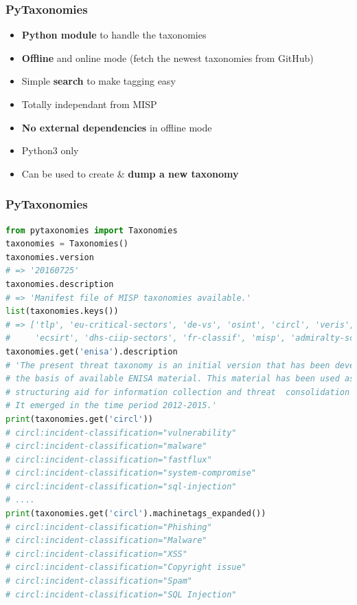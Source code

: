 \begin{frame}
        \frametitle{PyTaxonomies}
\begin{itemize}
    \item {\bf Python module} to handle the taxonomies
    \item {\bf Offline} and online mode (fetch the newest taxonomies from GitHub)
    \item Simple {\bf search} to make tagging easy
        \item Totally independant from MISP
        \item {\bf No external dependencies} in offline mode
        \item Python3 only
        \item Can be used to create \& {\bf dump a new taxonomy}
\end{itemize}
\end{frame}

\begin{frame}[fragile]
        \frametitle{PyTaxonomies}
    \begin{lstlisting}[language=Python,basicstyle=\tiny]
from pytaxonomies import Taxonomies
taxonomies = Taxonomies()
taxonomies.version
# => '20160725'
taxonomies.description
# => 'Manifest file of MISP taxonomies available.'
list(taxonomies.keys())
# => ['tlp', 'eu-critical-sectors', 'de-vs', 'osint', 'circl', 'veris',
# 	  'ecsirt', 'dhs-ciip-sectors', 'fr-classif', 'misp', 'admiralty-scale', ...]
taxonomies.get('enisa').description
# 'The present threat taxonomy is an initial version that has been developed on
# the basis of available ENISA material. This material has been used as an ENISA-internal
# structuring aid for information collection and threat  consolidation purposes.
# It emerged in the time period 2012-2015.'
print(taxonomies.get('circl'))
# circl:incident-classification="vulnerability"
# circl:incident-classification="malware"
# circl:incident-classification="fastflux"
# circl:incident-classification="system-compromise"
# circl:incident-classification="sql-injection"
# ....
print(taxonomies.get('circl').machinetags_expanded())
# circl:incident-classification="Phishing"
# circl:incident-classification="Malware"
# circl:incident-classification="XSS"
# circl:incident-classification="Copyright issue"
# circl:incident-classification="Spam"
# circl:incident-classification="SQL Injection"

\end{lstlisting}
\end{frame}

